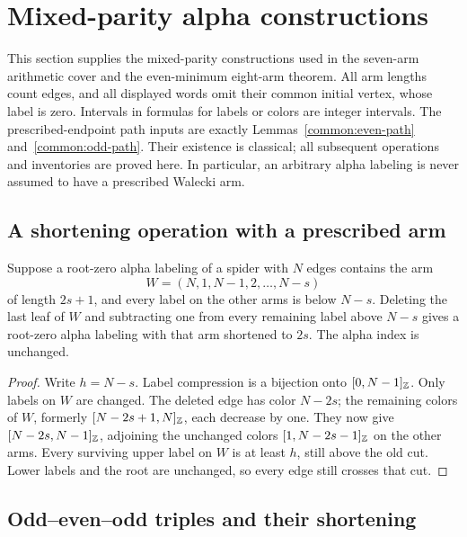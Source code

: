 \section{Mixed-parity alpha constructions}
\label{mc:chapter}
\label{app:ten-alpha}

This section supplies the mixed-parity constructions used in the
seven-arm arithmetic cover and the even-minimum eight-arm theorem.
All arm lengths count edges, and all displayed words omit their common
initial vertex, whose label is zero.  Intervals in formulas for labels
or colors are integer intervals.  The prescribed-endpoint path inputs
are exactly Lemmas~\ref{common:even-path} and~\ref{common:odd-path}.
Their existence is classical; all subsequent operations and inventories
are proved here.  In particular, an arbitrary alpha labeling is never
assumed to have a prescribed Walecki arm.

\subsection{A shortening operation with a prescribed arm}
\label{mc:shortening}

\begin{lemma}\label{mc:shorten}
Suppose a root-zero alpha labeling of a spider with $N$ edges contains
the arm
\[
 W=(N,1,N-1,2,\ldots,N-s)
\]
of length $2s+1$, and every label on the other arms is below $N-s$.
Deleting the last leaf of $W$ and subtracting one from every remaining
label above $N-s$ gives a root-zero alpha labeling with that arm
shortened to $2s$.  The alpha index is unchanged.
\end{lemma}
\begin{proof}
Write $h=N-s$.  Label compression is a bijection onto
$[0,N-1]_{\mathbb Z}$.  Only labels on $W$ are changed.  The deleted
edge has color $N-2s$; the remaining colors of $W$, formerly
$[N-2s+1,N]_{\mathbb Z}$, each decrease by one.  They now give
$[N-2s,N-1]_{\mathbb Z}$, adjoining the unchanged colors
$[1,N-2s-1]_{\mathbb Z}$ on the other arms.  Every surviving upper
label on $W$ is at least $h$, still above the old cut.  Lower labels
and the root are unchanged, so every edge still crosses that cut.
\end{proof}

\subsection{Odd--even--odd triples and their shortening}
\label{mc:oeo}

